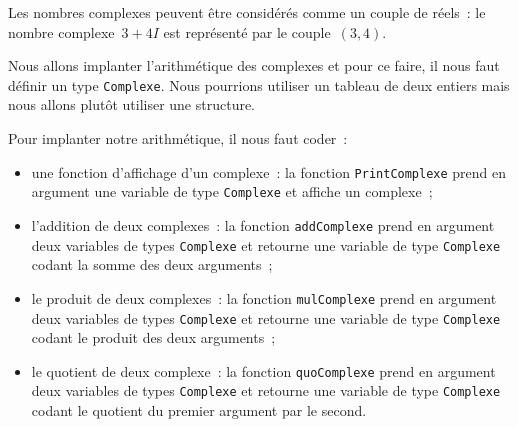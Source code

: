 \begin{exercice}
  Les nombres complexes peuvent  \^etre consid\'er\'es comme un couple
  de r\'eels~:  le  nombre complexe~$3+4I$  est  repr\'esent\'e par le
  couple~$(3,4)$.
\par
Nous allons implanter l'arithm\'etique des complexes et pour ce faire,
il nous faut   d\'efinir un  type \texttt{Complexe}.  Nous   pourrions
utiliser un tableau de deux entiers mais nous allons plut\^ot utiliser
une structure.
\par
Pour implanter notre arithm\'etique, il nous faut coder~:
\begin{itemize}
\item  une   fonction  d'affichage    d'un  complexe~:  la    fonction
  \texttt{PrintComplexe} prend    en  argument une   variable de  type
  \texttt{Complexe} et affiche un complexe~;
\item l'addition de deux complexes~: la fonction \texttt{addComplexe} prend en
  argument deux variables de  types \texttt{Complexe} et  retourne une
  variable   de  type   \texttt{Complexe} codant la    somme  des deux
  arguments~;
\item le produit de deux complexes~: la fonction \texttt{mulComplexe} prend en
  argument  deux variables de  types \texttt{Complexe} et retourne une
  variable de   type  \texttt{Complexe}  codant le  produit   des deux
  arguments~;
\item le quotient de deux complexe~: la fonction \texttt{quoComplexe} prend en
  argument deux variables de types  \texttt{Complexe} et retourne  une
  variable de  type  \texttt{Complexe} codant le   quotient du premier
  argument par le second.
\end{itemize}
\ifcorrection
\begin{correction}

\end{correction}
\fi
\end{exercice}
